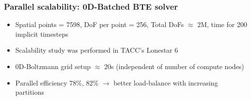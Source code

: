 \documentclass[mathserif, aspectratio=169]{beamer}
\begin{document}
\begin{frame}[fragile]
	\frametitle{Parallel scalability: 0D-Batched BTE solver}
	\begin{itemize}
		\item Spatial points = 7598, DoF per point = 256, Total DoFs $\approx$ 2M, time for 200 implicit timesteps
		\item Scalability study was performed in TACC's Lonestar 6 %
	\end{itemize}
	\begin{figure}
		\centering
	\end{figure}
	\begin{itemize}
		\item 0D-Boltzmann grid setup $\approx$ 20s (independent of number of compute nodes)
		\item Parallel efficiency 78\%, 82\% $\rightarrow$ better load-balance with increasing partitions
	\end{itemize}
\end{frame}
\end{document}
